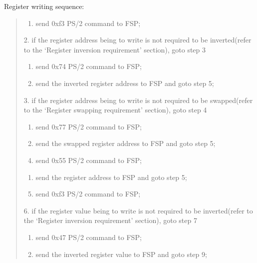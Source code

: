 \documentclass[a4paper,8pt,english]{sphinxmanual}
\begin{document}
Register writing sequence:
\begin{quote}
\begin{enumerate}
\item {} 
send 0xf3 PS/2 command to FSP;

\end{enumerate}

2. if the register address being to write is not required to be
inverted(refer to the `Register inversion requirement' section),
goto step 3
\begin{enumerate}
\item {} 
send 0x74 PS/2 command to FSP;

\item {} 
send the inverted register address to FSP and goto step 5;

\end{enumerate}

3. if the register address being to write is not required to be
swapped(refer to the `Register swapping requirement' section),
goto step 4
\begin{enumerate}
\item {} 
send 0x77 PS/2 command to FSP;

\item {} 
send the swapped register address to FSP and goto step 5;

\end{enumerate}
\begin{enumerate}
\setcounter{enumi}{3}
\item {} 
send 0x55 PS/2 command to FSP;

\end{enumerate}
\begin{enumerate}
\item {} 
send the register address to FSP and goto step 5;

\end{enumerate}
\begin{enumerate}
\setcounter{enumi}{4}
\item {} 
send 0xf3 PS/2 command to FSP;

\end{enumerate}

6. if the register value being to write is not required to be
inverted(refer to the `Register inversion requirement' section),
goto step 7
\begin{enumerate}
\item {} 
send 0x47 PS/2 command to FSP;

\item {} 
send the inverted register value to FSP and goto step 9;


\end{enumerate}
\end{quote}
\end{document}
